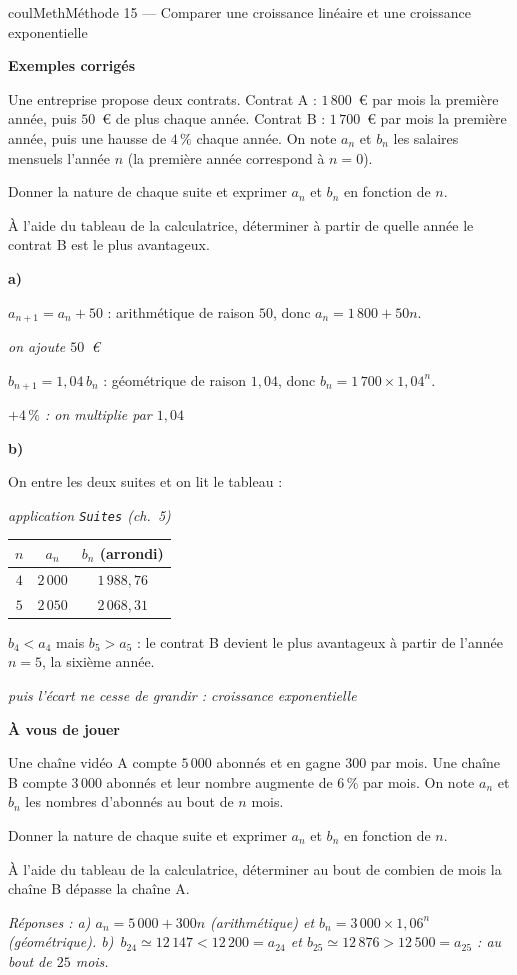 \documentclass[11pt,a4paper]{article}
\makeatletter
\renewcommand{\approx}{\simeq}
\newcounter{lycee@signet}
\newcommand{\signet}[3][]{\stepcounter{lycee@signet}%
  \edef\lycee@dest{\if\relax\detokenize{#1}\relax
    signet.\arabic{lycee@signet}\else#1\fi}%
  \hypertarget{\lycee@dest}{}\bookmark[level=#2,dest=\lycee@dest]{#3}}
\newcommand{\res}[1]{#1}
\newcounter{methode}
\newenvironment{methodebox}[1][Méthode]{\stepcounter{methode}%
  \begin{boitecours}[phantom={\signet[methode-\arabic{methode}]{2}{#1}}]{coulMeth}{#1}}%
  {\end{boitecours}}
\newcommand{\etape}[1]{\par\smallskip\textbf{\color{coulMeth}#1}\par\nobreak\smallskip}
\newcommand{\reponse}[1]{\par\smallskip
  {\footnotesize\itshape\color{black!55}Réponses : #1}}
\newcommand{\explique}[2]{\par\smallskip\noindent
  \begin{minipage}[t]{0.57\linewidth}\raggedright #1\end{minipage}\hfill
  \begin{minipage}[t]{0.40\linewidth}\raggedright\leavevmode
    {\small\itshape\color{black!60}#2}\end{minipage}\par}
\newcommand{\cas}[1]{\par\smallskip\noindent\textbf{\color{coulExo}#1}\vadjust{\nobreak}}
\newenvironment{correction}{\par}{\par}
\newcommand{\etapeexemples}{\etape{Exemples corrigés}}
\makeatother
\begin{document}
\begin{methodebox}[Méthode 15 --- Comparer une croissance linéaire et une croissance exponentielle]
\etapeexemples
Une entreprise propose deux contrats. Contrat A : $1\,800$~€ par mois la première
année, puis $50$~€ de plus chaque année. Contrat B : $1\,700$~€ par mois la première
année, puis une hausse de $4\,\%$ chaque année. On note $a_{n}$ et $b_{n}$ les salaires
mensuels l'année $n$ (la première année correspond à $n=0$).
\begin{questions}[label=\alph*)]
  \item Donner la nature de chaque suite et exprimer $a_{n}$ et $b_{n}$ en fonction de
        $n$.
  \item À l'aide du tableau de la calculatrice, déterminer à partir de quelle année le
        contrat B est le plus avantageux.
\end{questions}
\begin{correction}
\cas{a)}
\explique{$a_{n+1}=a_{n}+50$ : \res{arithmétique de raison $50$}, donc
$a_{n}=\res{1\,800+50n}$.}{on ajoute $50$~€}
\explique{$b_{n+1}=1{,}04\,b_{n}$ : \res{géométrique de raison $1{,}04$}, donc
$b_{n}=\res{1\,700\times 1{,}04^{n}}$.}{$+4\,\%$ : on multiplie par $1{,}04$}
\cas{b)}
\explique{On entre les deux suites et on lit le tableau :}{application \texttt{Suites}
(ch.~5)}
\begin{center}
\renewcommand{\arraystretch}{1.3}
\begin{tabular}{|c|c|c|}
\hline
$n$ & $a_{n}$ & $b_{n}$ (arrondi)\\\hline
$4$ & $2\,000$ & $1\,988{,}76$\\\hline
$5$ & $2\,050$ & $2\,068{,}31$\\\hline
\end{tabular}
\end{center}
\explique{$b_{4}<a_{4}$ mais $b_{5}>a_{5}$ : le contrat B devient le plus avantageux à
partir de l'année $n=\res{5}$, la sixième année.}{puis l'écart ne cesse de grandir :
croissance exponentielle}
\end{correction}

\etape{À vous de jouer}
Une chaîne vidéo A compte $5\,000$ abonnés et en gagne $300$ par mois. Une chaîne B
compte $3\,000$ abonnés et leur nombre augmente de $6\,\%$ par mois. On note $a_{n}$ et
$b_{n}$ les nombres d'abonnés au bout de $n$ mois.
\begin{questions}[label=\alph*)]
  \item Donner la nature de chaque suite et exprimer $a_{n}$ et $b_{n}$ en fonction de
        $n$.
  \item À l'aide du tableau de la calculatrice, déterminer au bout de combien de mois la
        chaîne B dépasse la chaîne A.
\end{questions}
\reponse{a) $a_{n}=5\,000+300n$ (arithmétique) et $b_{n}=3\,000\times 1{,}06^{n}$
(géométrique).\; b)~$b_{24}\approx 12\,147<12\,200=a_{24}$ et
$b_{25}\approx 12\,876>12\,500=a_{25}$ : au bout de $25$ mois.}
\end{methodebox}
\end{document}

